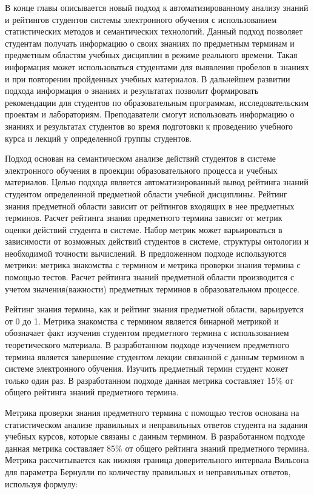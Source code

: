 В конце главы описывается новый подход к автоматизированному анализу знаний и рейтингов студентов системы электронного обучения с использованием статистических методов и семантических технологий. Данный подход позволяет студентам получать информацию о своих знаниях по предметным терминам и предметным областям учебных дисциплин в режиме реального времени. Такая информация может использоваться студентами для выявления пробелов в знаниях и при повторении пройденных учебных материалов. В дальнейшем развитии подхода информация о знаниях и результатах позволит формировать рекомендации для студентов по образовательным программам, исследовательским проектам и лабораториям. Преподаватели смогут использовать информацию о знаниях и результатах студентов во время подготовки к проведению учебного курса и лекций у определенной группы студентов.

Подход основан на семантическом анализе действий студентов в системе электронного обучения в проекции образовательного процесса и учебных материалов. Целью подхода является автоматизированный вывод рейтинга знаний студентом определенной предметной области учебной дисциплины. Рейтинг знания предметной области зависит от рейтингов входящих в нее предметных терминов. Расчет рейтинга знания предметного термина зависит от метрик оценки действий студента в системе. Набор метрик может варьироваться в зависимости от возможных действий студентов в системе, структуры онтологии и необходимой точности вычислений. В предложенном подходе используются метрики: метрика знакомства с термином и метрика проверки знания термина с помощью тестов. Расчет рейтинга знаний предметной области производится с учетом значения(важности) предметных терминов в образовательном процессе.

Рейтинг знания термина, как и рейтинг знания предметной области, варьируется от 0 до 1. Метрика знакомства с термином является бинарной метрикой и обозначает факт изучения студентом предметного термина с использованием теоретического материала. В разработанном подходе изучением предметного термина является завершение студентом лекции связанной с данным термином в системе электронного обучения. Изучить предметный термин студент может только один раз. В разработанном подходе данная метрика составляет 15\% от общего рейтинга знаний предметного термина.

Метрика проверки знания предметного термина с помощью тестов основана на статистическом анализе правильных и неправильных ответов студента на задания учебных курсов, которые связаны с данным термином. В разработанном подходе данная метрика составляет 85\% от общего рейтинга знаний предметного термина. Метрика рассчитывается как нижняя граница доверительного интервала Вильсона для параметра Бернулли по количеству правильных и неправильных ответов, используя формулу:

